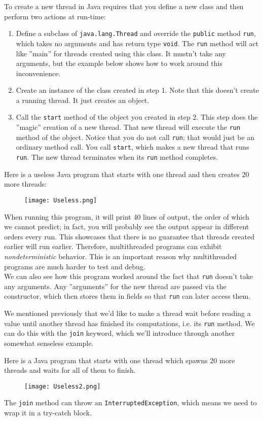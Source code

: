 \documentclass[main]{subfiles}
\begin{document}
To create a new thread in Java requires that you define a new class and then perform two actions at run-time:
\begin{enumerate}
    \item Define a subclass of \texttt{java.lang.Thread} and override the \texttt{public} method \texttt{run}, which takes no arguments and has return type \texttt{void}. The \texttt{run} method will act like ''main'' for threads created using this class. It mustn't take any arguments, but the example below shows how to work around this inconvenience.
    \item Create an instance of the class created in step 1. Note that this doesn't create a running thread. It just creates an object.
    \item Call the \texttt{start} method of the object you created in step 2. This step does the ''magic'' creation of a new thread. That new thread will execute the \texttt{run} method of the object. Notice that you do not call \texttt{run}; that would just be an ordinary method call. You call \texttt{start}, which makes a new thread that runs \texttt{run}. The new thread terminates when its \texttt{run} method completes.
\end{enumerate}
\begin{example}
    Here is a useless Java program that starts with one thread and then creates 20 more threads:
    \begin{figure}[H]
        \centering
        \texttt{[image: Useless.png]}
    \end{figure}
    When running this program, it will print 40 lines of output, the order of which we cannot predict; in fact, you will probably see the output appear in different orders every run. This showcases that there is no guarantee that threads created earlier will run earlier. Therefore, multithreaded programs can exhibit \textit{nondeterministic} behavior. This is an important reason why multithreaded programs are much harder to test and debug.\\[3mm]
    We can also see how this program worked around the fact that \texttt{run} doesn't take any arguments. Any ''arguments'' for the new thread are passed via the constructor, which then stores them in fields so that \texttt{run} can later access them.
\end{example}
We mentioned previously that we'd like to make a thread wait before reading a value until another thread has finished its computations, i.e. its \texttt{run} method. We can do this with the \texttt{join} keyword, which we'll introduce through another somewhat senseless example.
\begin{example}
    Here is a Java program that starts with one thread which spawns 20 more threads and waits for all of them to finish.
    \begin{figure}[H]
        \centering
        \texttt{[image: Useless2.png]}
    \end{figure}
    The \texttt{join} method can throw an \texttt{InterruptedException}, which means we need to wrap it in a try-catch block.
\end{example}
\end{document}
